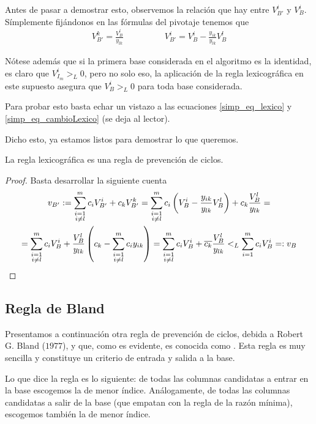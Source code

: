 Antes de pasar a demostrar esto, observemos la relación que hay entre $V_{B'}^i$ y $V_B^i$. Símplemente fijándonos en las fórmulas del pivotaje tenemos que
\begin{equation}
\label{simp_eq_cambioLexico}
	\begin{array}{cc}
		\displaystyle{V_{B'}^k=\frac{V_B^l}{y_{lk}}}\qquad&\qquad \displaystyle{V_{B'}^i=V_B^i-\frac{y_{ik}}{y_{lk}}V_B^l}
	\end{array}
\end{equation}
\begin{obs}[Positividad]
	Nótese además que si la primera base considerada en el algoritmo es la identidad, es claro que $V_{I_m}^i>_L0$, pero no solo eso, la aplicación de la regla lexicográfica en este supuesto asegura que $V_B^i>_L0$ para toda base considerada.
	
	Para probar esto basta echar un vistazo a las ecuaciones \eqref{simp_eq_lexico} y \eqref{simp_eq_cambioLexico} (se deja al lector).
\end{obs}
Dicho esto, ya estamos listos para demostrar lo que queremos.
\begin{prop}
	La regla lexicográfica es una regla de prevención de ciclos.
\end{prop}
\begin{proof}
	Basta desarrollar la siguiente cuenta
	\begin{multline*}
		v_{B'}:=\sum_{\substack{i=1\\i\not=l}}^{m}c_iV_{B'}^i+c_kV_{B'}^k=\sum_{\substack{i=1\\i\not=l}}^{m}c_i\left(V_B^i-\frac{y_{ik}}{y_{lk}}V_B^l\right)+c_k\frac{V_B^l}{y_{lk}}=\\=\sum_{\substack{i=1\\i\not=l}}^{m}c_iV_B^i+\frac{V_B^l}{y_{lk}}\left(c_k-\sum_{\substack{i=1\\i\not=l}}^{m}c_iy_{ik}\right)=\sum_{\substack{i=1\\i\not=l}}^{m}c_iV_B^i+\overline{c_k}\frac{V_B^l}{y_{lk}}<_L\sum_{i=1}^{m}c_iV_B^i=:v_B\qedhere
	\end{multline*}
\end{proof}
\subsection{Regla de Bland}
Presentamos a continuación otra regla de prevención de ciclos, debida a Robert G. Bland ($1977$), y que, como es evidente, es conocida como . Esta regla es muy sencilla y constituye un criterio de entrada y salida a la base.

Lo que dice la regla es lo siguiente: de todas las columnas candidatas a entrar en la base escogemos la de menor índice. Análogamente, de todas las columnas candidatas a salir de la base (que empatan con la regla de la razón mínima), escogemos también la de menor índice.  
